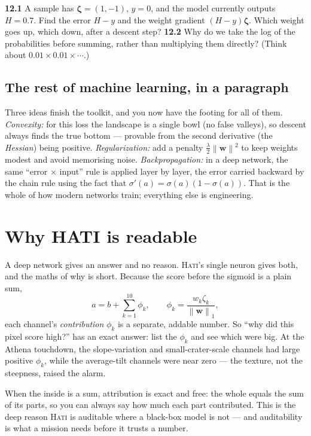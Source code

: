 \documentclass[11pt,oneside]{book}
\newcommand{\norm}[1]{\left\lVert #1\right\rVert}
\begin{document}
\begin{practice}
\textbf{12.1} A sample has $\boldsymbol\zeta=(1,-1)$, $y=0$, and the model currently
outputs $H=0.7$. Find the error $H-y$ and the weight gradient $(H-y)\boldsymbol\zeta$.
Which weight goes up, which down, after a descent step? \quad\textbf{12.2} Why do we
take the log of the probabilities before summing, rather than multiplying them
directly? (Think about $0.01\times0.01\times\cdots$.)
\end{practice}

\section*{The rest of machine learning, in a paragraph}
Three ideas finish the toolkit, and you now have the footing for all of them.
\emph{Convexity:} for this loss the landscape is a single bowl (no false valleys), so
descent always finds the true bottom --- provable from the second derivative (the
\emph{Hessian}) being positive. \emph{Regularization:} add a penalty
$\tfrac{\lambda}{2}\norm{\mathbf w}^2$ to keep weights modest and avoid memorising
noise. \emph{Backpropagation:} in a deep network, the same ``error $\times$ input''
rule is applied layer by layer, the error carried backward by the chain rule using the
fact that $\sigma'(a)=\sigma(a)(1-\sigma(a))$. That is the whole of how modern networks
train; everything else is engineering.

\chapter{Why HATI is readable}

A deep network gives an answer and no reason. \textsc{Hati}'s single neuron gives both,
and the maths of why is short. Because the score before the sigmoid is a plain sum,
\begin{equation}
a=b+\sum_{k=1}^{10}\phi_k,\qquad \phi_k=\frac{w_k\zeta_k}{\norm{\mathbf w}_1},
\end{equation}
each channel's \emph{contribution} $\phi_k$ is a separate, addable number. So ``why did
this pixel score high?'' has an exact answer: list the $\phi_k$ and see which were big.
At the Athena touchdown, the slope-variation and small-crater-scale channels had large
positive $\phi_k$, while the average-tilt channels were near zero --- the texture, not
the steepness, raised the alarm.

\begin{keyidea}
When the inside is a sum, attribution is exact and free: the whole equals the sum of
its parts, so you can always say how much each part contributed. This is the deep
reason \textsc{Hati} is auditable where a black-box model is not --- and auditability
is what a mission needs before it trusts a number.
\end{keyidea}
\end{document}
